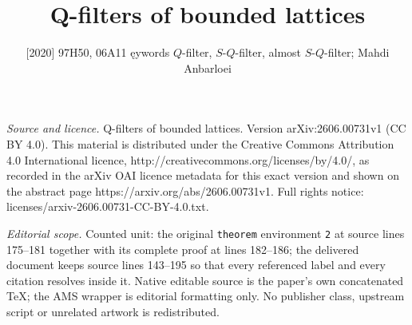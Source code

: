 \documentclass[10pt,a4paper]{amsart}
\numberwithin{equation}{section}
\begin{document}
\title[Q-filters of bounded lattices]{Q-filters of bounded lattices}
\author{[2020] 97H50, 06A11 ęywords $ Q $-filter, $S$-$ Q $-filter, almost $S$-$ Q $-filter; Mahdi Anbarloei}
\date{}
\maketitle
\noindent\emph{Source and licence.} Q-filters of bounded lattices. Version arXiv:2606.00731v1 (CC BY 4.0). This material is distributed under the Creative Commons Attribution 4.0 International licence, http://creativecommons.org/licenses/by/4.0/, as recorded in the arXiv OAI licence metadata for this exact version and shown on the abstract page https://arxiv.org/abs/2606.00731v1. Full rights notice: licenses/arxiv-2606.00731-CC-BY-4.0.txt.\par\smallskip
\noindent\textit{Editorial scope.} Counted unit: the original \texttt{theorem} environment \texttt{2} at source lines 175--181 together with its complete proof at lines 182--186; the delivered document keeps source lines 143--195 so that every referenced label and every citation resolves inside it. Native editable source is the paper's own concatenated TeX; the AMS wrapper is editorial formatting only. No publisher class, upstream script or unrelated artwork is redistributed.
\end{document}
